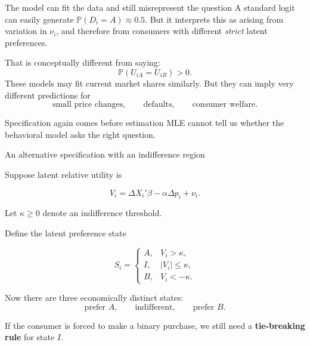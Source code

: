 \documentclass[aspectratio=169,11pt]{beamer}
\newcommand{\Pp}{\mathbb{P}}
\begin{document}
\begin{frame}{The model can fit the data and still misrepresent the question}
A standard logit can easily generate $\Pp(D_i=A)\approx 0.5$. But it interprets
this as arising from variation in $\nu_i$, and therefore from consumers with
different \emph{strict} latent preferences.

That is conceptually different from saying:
\[
\boxed{\Pp(U_{iA}=U_{iB})>0.}
\]
These models may fit current market shares similarly. But they can imply very
different predictions for
\[
\text{small price changes},
\qquad
\text{defaults},
\qquad
\text{consumer welfare}.
\]

\begin{alertblock}{Specification again comes before estimation}
MLE cannot tell us whether the behavioral model asks the right question.
\end{alertblock}
\end{frame}

\begin{frame}{An alternative specification with an indifference region}

Suppose latent relative utility is

\[
V_i
=
\Delta X_i'\beta
-
\alpha\Delta p_i
+
\nu_i.
\]

Let $\kappa\geq0$ denote an indifference threshold.

Define the latent preference state

\[
S_i=
\begin{cases}
A, & V_i>\kappa,\\[0.3em]
I, & |V_i|\leq\kappa,\\[0.3em]
B, & V_i<-\kappa.
\end{cases}
\]

Now there are three economically distinct states:
\[
\boxed{
\text{prefer }A,
\qquad
\text{indifferent},
\qquad
\text{prefer }B.
}
\]

If the consumer is forced to make a binary purchase, we still need a
\textbf{tie-breaking rule} for state $I$.

\end{frame}
\end{document}
